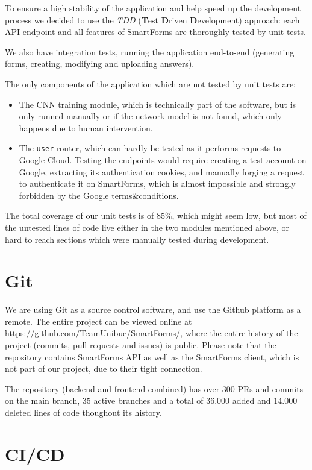 \documentclass[11pt, a4paper]{report}
\def\code#1{\texttt{#1}}
\begin{document}
To ensure a high stability of the application and help speed up the development process we decided to use the \textit{TDD} (\textbf{T}est \textbf{D}riven \textbf{D}evelopment) approach: each API endpoint and all features of SmartForms are thoroughly tested by unit tests.

We also have integration tests, running the application end-to-end (generating forms, creating, modifying and uploading answers).

The only components of the application which are not tested by unit tests are:
\begin{itemize}
	\item The CNN training module, which is technically part of the software, but is only runned manually or if the network model is not found, which only happens due to human intervention.
	\item The \code{user} router, which can hardly be tested as it performs requests to Google Cloud. Testing the endpoints would require creating a test account on Google, extracting its authentication cookies, and manually forging a request to authenticate it on SmartForms, which is almost impossible and strongly forbidden by the Google terms\&conditions. 
\end{itemize}

The total coverage of our unit tests is of $85\%$, which might seem low, but most of the untested lines of code live either in the two modules mentioned above, or hard to reach sections which were manually tested during development.

\section{Git}

We are using Git\cite{Git} as a source control software, and use the Github platform as a remote. The entire project can be viewed online at \url{https://github.com/TeamUnibuc/SmartForms/}, where the entire history of the project (commits, pull requests and issues) is public. Please note that the repository contains SmartForms API as well as the SmartForms client, which is not part of our project, due to their tight connection.

The repository (backend and frontend combined) has over $300$ PRs and commits on the main branch, $35$ active branches and a total of $36.000$ added and $14.000$ deleted lines of code thoughout its history. 


\section{CI/CD}
\end{document}
